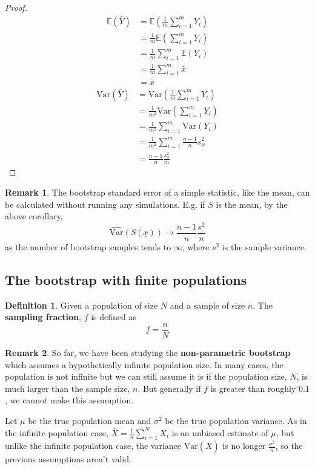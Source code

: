 \documentclass[12pt,a4paper]{article}
\theoremstyle{definition}
\newtheorem{definition}{Definition}[subsection]
\newtheorem*{remark}{Remark}
\begin{document}
\begin{proof}
	\[
		\begin{aligned}
			\mathbb{E}(\bar{Y})
				& = \mathbb{E} \left( \frac{1}{m} \sum_{i = 1}^m Y_i \right) \\
				& = \frac{1}{m} \mathbb{E} \left( \sum_{i = 1}^m Y_i \right) \\
				& = \frac{1}{m} \sum_{i = 1}^m \mathbb{E}(Y_i) \\
				& = \frac{1}{m} \sum_{i = 1}^m \bar{x} \\
				& = \bar{x}
		\end{aligned}
	\]
	\[
		\begin{aligned}
			\text{Var}(\bar{Y})
				& = \text{Var} \left( \frac{1}{m} \sum_{i = 1}^m Y_i \right) \\
				& = \frac{1}{m^2} \text{Var} \left( \sum_{i = 1}^m Y_i \right) \\
				& = \frac{1}{m^2} \sum_{i = 1}^m \text{Var}(Y_i) \\
				& = \frac{1}{m^2} \sum_{i = 1}^m \frac{n - 1}{n} s_x^2 \\
				& = \frac{n - 1}{n} \frac{s_x^2}{m}
		\end{aligned}
	\]
\end{proof}

\begin{remark}
	The bootstrap standard error of a simple statistic, like the mean, can be calculated without running any simulations. E.g. if $S$ is the mean, by the above corollary,
	\[
		\widehat{\text{Var}}(S(\underline{x})) \rightarrow \frac{n - 1}{n} \frac{s^2}{n}
	\]
	as the number of bootstrap samples tends to $\infty$, where $s^2$ is the sample variance.
\end{remark}

\subsection{The bootstrap with finite populations}

\begin{definition}
	Given a population of size $N$ and a sample of size $n$. The \textbf{sampling fraction}, $f$ is defined as
	\[
		f = \frac{n}{N}
	\]
\end{definition}

\begin{remark}	
	So far, we have been studying the \textbf{non-parametric bootstrap} which assumes a hypothetically infinite population size. In many cases, the population is not infinite but we can still assume it is if the population size, $N$, is much larger than the sample size, $n$. But generally if $f$ is greater than roughly $0.1$, we cannot make this assumption.
	
	Let $\mu$ be the true population mean and $\sigma^2$ be the true population variance. As in the infinite population case, $\bar{X} = \frac{1}{n} \sum_{i = 1}^{N} X_i$ is an unbiased estimate of $\mu$, but unlike the infinite population case, the variance $\text{Var}(\bar{X})$ is no longer $\frac{\sigma^2}{n}$, so the previous assumptions aren't valid.
\end{remark}
	
\end{document}
